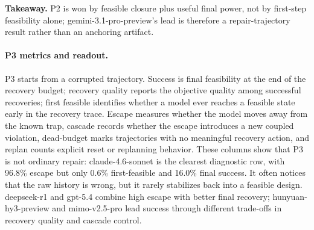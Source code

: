 \noindent\textbf{Takeaway.} P2 is won by feasible closure plus useful final power, not by first-step feasibility alone; gemini-3.1-pro-preview's lead is therefore a repair-trajectory result rather than an anchoring artifact.

\paragraph{P3 metrics and readout.}
P3 starts from a corrupted trajectory. Success is final feasibility at the end of the recovery budget; recovery quality reports the objective quality among successful recoveries; first feasible identifies whether a model ever reaches a feasible state early in the recovery trace. Escape measures whether the model moves away from the known trap, cascade records whether the escape introduces a new coupled violation, dead-budget marks trajectories with no meaningful recovery action, and replan counts explicit reset or replanning behavior. These columns show that P3 is not ordinary repair: claude-4.6-sonnet is the clearest diagnostic row, with 96.8\% escape but only 0.6\% first-feasible and 16.0\% final success. It often notices that the raw history is wrong, but it rarely stabilizes back into a feasible design. deepseek-r1 and gpt-5.4 combine high escape with better final recovery; hunyuan-hy3-preview and mimo-v2.5-pro lead success through different trade-offs in recovery quality and cascade control.

